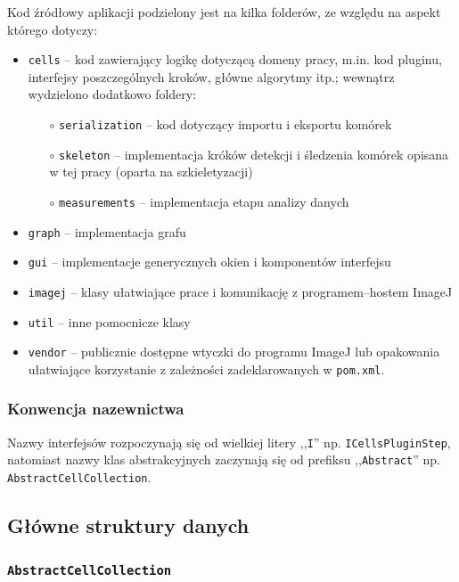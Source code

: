 \documentclass[declaration,shortabstract,mgr]{iithesis}
\begin{document}
Kod źródłowy aplikacji podzielony jest na kilka folderów, ze względu na aspekt którego dotyczy:

\begin{itemize}
  \item \texttt{cells} -- kod zawierający logikę dotyczącą domeny pracy, m.in. kod pluginu, interfejsy poszczególnych kroków, główne algorytmy itp.; wewnątrz wydzielono dodatkowo foldery:
  \begin{itemize}
    \item[$\circ$] \texttt{serialization} -- kod dotyczący importu i eksportu komórek
    \item[$\circ$] \texttt{skeleton} -- implementacja króków detekcji i śledzenia komórek opisana w tej pracy (oparta na szkieletyzacji)
    \item[$\circ$] \texttt{measurements} -- implementacja etapu analizy danych
  \end{itemize}
  \item \texttt{graph} -- implementacja grafu
  \item \texttt{gui} -- implementacje generycznych okien i komponentów interfejsu
  \item \texttt{imagej} -- klasy ułatwiające prace i komunikację z programem--hostem ImageJ
  \item \texttt{util} -- inne pomocnicze klasy
  \item \texttt{vendor} -- publicznie dostępne wtyczki do programu ImageJ lub opakowania ułatwiające korzystanie z zależności zadeklarowanych w \texttt{pom.xml}.
\end{itemize}

\subsubsection{Konwencja nazewnictwa}

Nazwy interfejsów rozpoczynają się od wielkiej litery ,,\texttt{I}'' np. \texttt{ICellsPluginStep}, natomiast nazwy klas abstrakcyjnych zaczynają się od prefiksu ,,\texttt{Abstract}'' np. \texttt{AbstractCellCollection}.

\subsection{Główne struktury danych}

\subsubsection{\texttt{AbstractCellCollection}}
\end{document}
